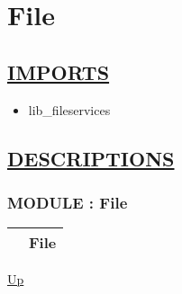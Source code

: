 \chapter*{File}
\hypertarget{ecldoc:toc:File}{}

\section*{\underline{IMPORTS}}
\begin{itemize}
\item lib\_fileservices
\end{itemize}

\section*{\underline{DESCRIPTIONS}}
\subsection*{MODULE : File}
\hypertarget{ecldoc:File}{}

{\renewcommand{\arraystretch}{1.5}
\begin{tabularx}{\textwidth}{|>{\raggedright\arraybackslash}l|X|}
\hline
\hspace{0pt} & File \\
\hline
\end{tabularx}
}

\hyperlink{ecldoc:toc:root}{Up}

\par


